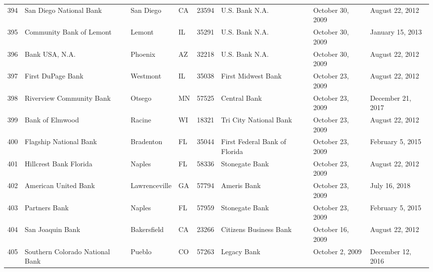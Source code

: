 \begin{tabular}{llllrlll}
394 &                            San Diego National Bank &           San Diego &  CA &  23594 &                                     U.S. Bank N.A. &    October 30, 2009 &     August 22, 2012 \\
395 &                           Community Bank of Lemont &              Lemont &  IL &  35291 &                                     U.S. Bank N.A. &    October 30, 2009 &    January 15, 2013 \\
396 &                                     Bank USA, N.A. &             Phoenix &  AZ &  32218 &                                     U.S. Bank N.A. &    October 30, 2009 &     August 22, 2012 \\
397 &                                  First DuPage Bank &            Westmont &  IL &  35038 &                                 First Midwest Bank &    October 23, 2009 &     August 22, 2012 \\
398 &                           Riverview Community Bank &              Otsego &  MN &  57525 &                                       Central Bank &    October 23, 2009 &   December 21, 2017 \\
399 &                                    Bank of Elmwood &              Racine &  WI &  18321 &                             Tri City National Bank &    October 23, 2009 &     August 22, 2012 \\
400 &                             Flagship National Bank &           Bradenton &  FL &  35044 &                      First Federal Bank of Florida &    October 23, 2009 &    February 5, 2015 \\
401 &                             Hillcrest Bank Florida &              Naples &  FL &  58336 &                                     Stonegate Bank &    October 23, 2009 &     August 22, 2012 \\
402 &                               American United Bank &       Lawrenceville &  GA &  57794 &                                        Ameris Bank &    October 23, 2009 &       July 16, 2018 \\
403 &                                      Partners Bank &              Naples &  FL &  57959 &                                     Stonegate Bank &    October 23, 2009 &    February 5, 2015 \\
404 &                                   San Joaquin Bank &         Bakersfield &  CA &  23266 &                             Citizens Business Bank &    October 16, 2009 &     August 22, 2012 \\
405 &                    Southern Colorado National Bank &              Pueblo &  CO &  57263 &                                        Legacy Bank &     October 2, 2009 &   December 12, 2016 \\

\end{tabular}

